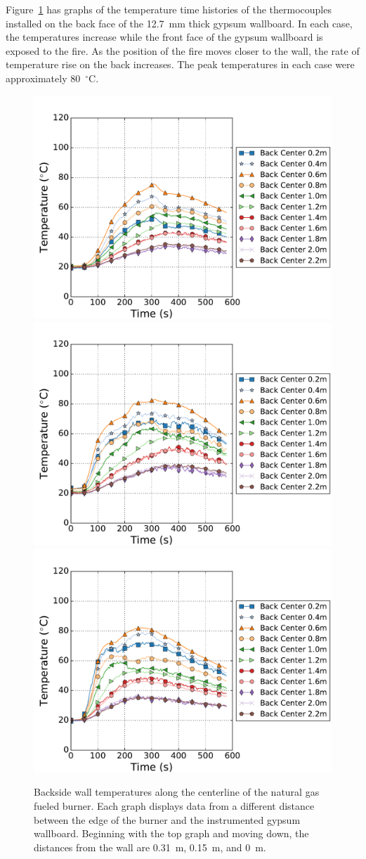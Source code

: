 \documentclass[twoside]{uocthesis}
\begin{document}
{Figure~\ref{IWGB_NG_TC_Backside_set} has graphs of the temperature time histories of the thermocouples installed on the back face of the 12.7~mm thick gypsum wallboard.  In each case, the temperatures increase while the front face of the gypsum wallboard is exposed to the fire.  As the position of the fire moves closer to the wall, the rate of temperature rise on the back increases.  The peak temperatures in each case were approximately 80~$^\circ$C.   

\begin{figure}[ht!]
	\centering
	\includegraphics[width=.625\columnwidth]{../Figures/IWGBNG01_TC_Back_Center_Avg}\\
	\includegraphics[width=.625\columnwidth]{../Figures/IWGBNG04_TC_Back_Center_Avg}\\
	\includegraphics[width=.625\columnwidth]{../Figures/IWGBNG05_TC_Back_Center_Avg}\\
	\caption[Backside wall temperatures for the natural gas fueled burner]{Backside wall temperatures along the centerline of the natural gas fueled burner. Each graph displays data from a different distance between the edge of the burner and the instrumented gypsum wallboard.  Beginning with the top graph and moving down, the distances from the wall are 0.31~m, 0.15~m, and 0~m.}
	\label{IWGB_NG_TC_Backside_set}
\end{figure}

}
\end{document}
